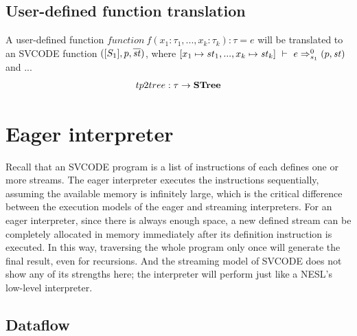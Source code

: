 

\subsection{User-defined function translation}
A user-defined function $function \  f(x_1: \tau_1, ..., x_k: \tau_k): \tau = e $ will be translated to an SVCODE function
$([S_1], p, \overline{\mathit{st}})$, where $\Trans{[x_1 \|-> st_1,..., x_k \|-> \st_k ]}{e}{0}{s_1}{\sfun{p}{\st}}$ and ...
$$ tp2tree : \tau \rightarrow \mathbf{STree}  $$ 


\section{Eager interpreter}
Recall that an SVCODE program is a list of instructions of each defines one or more streams. 
The eager interpreter executes the instructions sequentially, assuming the available memory is infinitely large, which is the critical difference between the execution models of the eager and streaming interpreters.
For an eager interpreter, since there is always enough space, a new defined stream can be completely allocated in memory immediately after its definition instruction is executed.
In this way, traversing the whole program only once will generate the final result, even for recursions.
And the streaming model of SVCODE does not show any of its strengths here; the interpreter will perform just like a NESL's low-level interpreter. 

\subsection{Dataflow}

